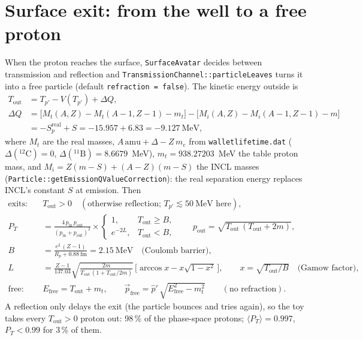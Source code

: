 \documentclass[11pt]{article}
\newcommand{\vv}[1]{\vec{#1}}
\newcommand{\code}[1]{\texttt{#1}}
\begin{document}
\section{Surface exit: from the well to a free proton}\label{sec:exit}

When the proton reaches the surface, \code{SurfaceAvatar} decides between transmission
and reflection and \code{TransmissionChannel::particleLeaves} turns it into a free
particle (default \code{refraction = false}). The kinetic energy outside is
\begin{align*}
T_{\mathrm{out}} &= T_{p'}-V(T_{p'})+\Delta Q,\\
\Delta Q &= \big[M_t(A,Z)-M_t(A-1,Z-1)-m_t\big]-\big[M_i(A,Z)-M_i(A-1,Z-1)-m\big]\\
&= -S_p^{\mathrm{real}}+S=-15.957+6.83=-9.127~\text{MeV},
\end{align*}
where $M_t$ are the real masses, $A\,\mathrm{amu}+\Delta-Z\,m_e$ from
\code{walletlifetime.dat} ($\Delta(^{12}\mathrm{C})=0$, $\Delta(^{11}\mathrm{B})=8.6679$~MeV),
$m_t=938.27203$~MeV the table proton mass, and $M_i=Z(m-S)+(A-Z)(m-S)$ the INCL masses
(\code{Particle::getEmissionQValueCorrection}): the real separation energy replaces
INCL's constant $S$ at emission. Then
\begin{align*}
\text{exits:}\quad & T_{\mathrm{out}}>0
\quad(\text{otherwise reflection; } T_{p'}\lesssim 50~\text{MeV here}),\\
P_T &= \frac{4\,p_{\mathrm{in}}\,p_{\mathrm{out}}}{(p_{\mathrm{in}}+p_{\mathrm{out}})^2}\times
\begin{cases}1, & T_{\mathrm{out}}\ge B,\\ e^{-2L}, & T_{\mathrm{out}}<B,\end{cases}
\qquad p_{\mathrm{out}}=\sqrt{T_{\mathrm{out}}\,(T_{\mathrm{out}}+2m)},\\
B &= \frac{e^2\,(Z-1)}{R_p+0.88~\mathrm{fm}}=2.15~\text{MeV}\quad\text{(Coulomb barrier)},\\
L &= \frac{Z-1}{137.03}\sqrt{\frac{2m}{T_{\mathrm{out}}\,(1+T_{\mathrm{out}}/2m)}}
\,\big[\arccos x-x\sqrt{1-x^2}\,\big],\qquad x=\sqrt{T_{\mathrm{out}}/B}
\quad\text{(Gamow factor)},\\
\text{free:}\quad & E_{\mathrm{free}}=T_{\mathrm{out}}+m_t,\qquad
\vv p_{\mathrm{free}}=\hat{p}'\,\sqrt{E_{\mathrm{free}}^2-m_t^2}\qquad(\text{no refraction}).
\end{align*}
A reflection only delays the exit (the particle bounces and tries again), so the toy
takes every $T_{\mathrm{out}}>0$ proton out: 98\,\% of the phase-space protons;
$\langle P_T\rangle=0.997$, $P_T<0.99$ for 3\,\% of them.
\end{document}
